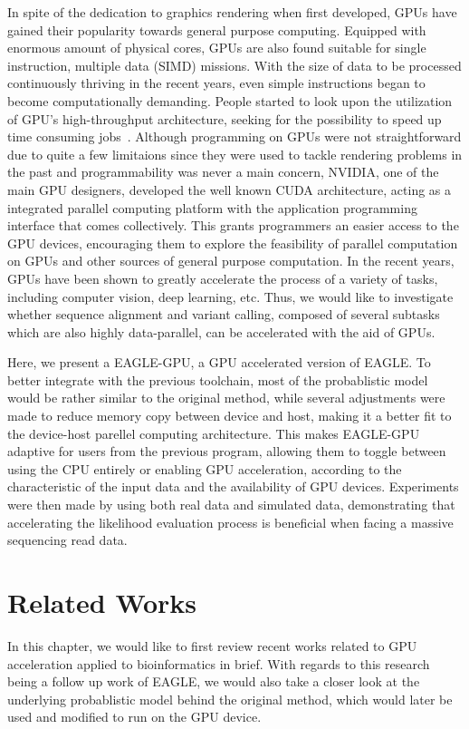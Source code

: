 \documentclass{PHlab-thesis}
\begin{document}
In spite of the dedication to graphics rendering when first developed, GPUs have gained their popularity towards general purpose computing. Equipped with enormous amount of physical cores, GPUs are also found suitable for single instruction, multiple data (SIMD) missions. With the size of data to be processed continuously thriving in the recent years, even simple instructions began to become computationally demanding. People started to look upon the utilization of GPU's high-throughput architecture, seeking for the possibility to speed up time consuming jobs~\cite{owens2008gpu,nickolls2010gpu}. Although programming on GPUs were not straightforward due to quite a few limitaions since they were used to tackle rendering problems in the past and programmability was never a main concern, NVIDIA, one of the main GPU designers, developed the well known CUDA architecture, acting as a integrated parallel computing platform with the application programming interface that comes collectively. This grants programmers an easier access to the GPU devices, encouraging them to explore the feasibility of parallel computation on GPUs and other sources of general purpose computation. In the recent years, GPUs have been shown to greatly accelerate the process of a variety of tasks, including computer vision, deep learning, etc. Thus, we would like to investigate whether sequence alignment and variant calling, composed of several subtasks which are also highly data-parallel, can be accelerated with the aid of GPUs.

Here, we present a EAGLE-GPU, a GPU accelerated version of EAGLE. To better integrate with the previous toolchain, most of the probablistic model would be rather similar to the original method, while several adjustments were made to reduce memory copy between device and host, making it a better fit to the device-host parellel computing architecture. This makes EAGLE-GPU adaptive for users from the previous program, allowing them to toggle between using the CPU entirely or enabling GPU acceleration, according to the characteristic of the input data and the availability of GPU devices. Experiments were then made by using both real data and simulated data, demonstrating that accelerating the likelihood evaluation process is beneficial when facing a massive sequencing read data.

\chapter{Related Works}
In this chapter, we would like to first review recent works related to GPU acceleration applied to bioinformatics in brief. With regards to this research being a follow up work of EAGLE, we would also take a closer look at the underlying probablistic model behind the original method, which would later be used and modified to run on the GPU device.
\end{document}
